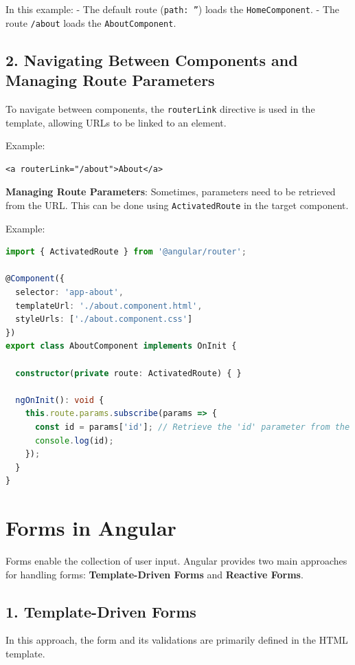 \documentclass{article}
\begin{document}
In this example:
- The default route (\texttt{path: ''}) loads the \texttt{HomeComponent}.
- The route \texttt{/about} loads the \texttt{AboutComponent}.

\subsection*{2. Navigating Between Components and Managing Route Parameters}

To navigate between components, the \texttt{routerLink} directive is used in the template, allowing URLs to be linked to an element.

Example:
\begin{verbatim}
<a routerLink="/about">About</a>
\end{verbatim}

\textbf{Managing Route Parameters}:
Sometimes, parameters need to be retrieved from the URL. This can be done using \texttt{ActivatedRoute} in the target component.

Example:
\begin{lstlisting}[language=TypeScript, caption={Retrieving Route Parameters}, label={lst:typescript-route-params}]
import { ActivatedRoute } from '@angular/router';

@Component({
  selector: 'app-about',
  templateUrl: './about.component.html',
  styleUrls: ['./about.component.css']
})
export class AboutComponent implements OnInit {

  constructor(private route: ActivatedRoute) { }

  ngOnInit(): void {
    this.route.params.subscribe(params => {
      const id = params['id']; // Retrieve the 'id' parameter from the URL
      console.log(id);
    });
  }
}
\end{lstlisting}

\section*{Forms in Angular}

Forms enable the collection of user input. Angular provides two main approaches for handling forms: \textbf{Template-Driven Forms} and \textbf{Reactive Forms}.

\subsection*{1. Template-Driven Forms}

In this approach, the form and its validations are primarily defined in the HTML template.
\end{document}
